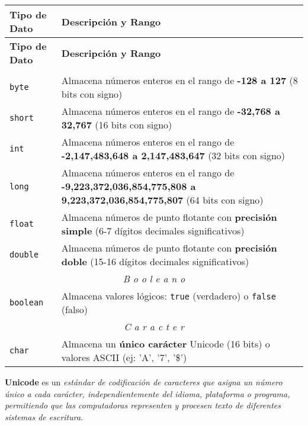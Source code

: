 \documentclass[12pt]{article}
\theoremstyle{largebreak}
\begin{document}
    \begin{longtable}{l p{}}
    \toprule
    \textbf{Tipo de Dato} & \textbf{Descripción y Rango} \\
    \midrule
    \endfirsthead

    \midrule
    \textbf{Tipo de Dato} & \textbf{Descripción y Rango} \\
    \midrule
    \endhead

    \bottomrule
    \endfoot

    \multicolumn{2}{c}{\textit{N ú m e r o s}} \\
    \hline

    \lstinline|byte| & Almacena números enteros en el rango de \textbf{-128 a 127} (8 bits con signo) \\
    \lstinline|short| & Almacena números enteros en el rango de \textbf{-32,768 a 32,767} (16 bits con signo) \\
    \lstinline|int| & Almacena números enteros en el rango de \textbf{-2,147,483,648 a 2,147,483,647} (32 bits con signo) \\
    \lstinline|long| & Almacena números enteros en el rango de \textbf{-9,223,372,036,854,775,808 a 9,223,372,036,854,775,807} (64 bits con signo) \\
    \lstinline|float| & Almacena números de punto flotante con \textbf{precisión simple} (6-7 dígitos decimales significativos) \\
    \lstinline|double| & Almacena números de punto flotante con \textbf{precisión doble} (15-16 dígitos decimales significativos) \\
    \hline
    \multicolumn{2}{c}{\textit{B o o l e a n o}} \\
    \hline
    \lstinline|boolean| & Almacena valores lógicos: \lstinline|true| (verdadero) o \lstinline|false| (falso) \\
    \hline\multicolumn{2}{c}{\textit{C a r a c t e r}} \\
    \hline
    \lstinline|ch|\lstinline|ar| & Almacena un \textbf{único carácter} Unicode (16 bits) o valores ASCII (ej: 'A', '7', '\$') \\
    \end{longtable}

    \begin{mydef}
        \textbf{Unicode} es un \textit{estándar de codificación de caracteres que asigna un número único a cada carácter, independientemente del idioma, plataforma o programa, permitiendo que las computadoras representen y procesen texto de diferentes sistemas de escritura}. 
    \end{mydef}
\end{document}
